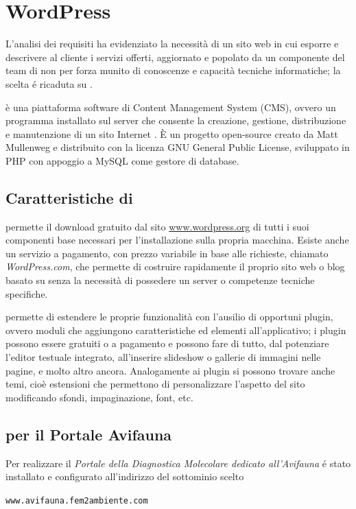 \chapter{WordPress}
\label{chp:wp}
L'analisi dei requisiti ha evidenziato la necessità di un sito web in cui esporre e descrivere al cliente i servizi offerti, aggiornato e popolato da un componente del team di {\fem} non per forza munito di conoscenze e capacità tecniche informatiche; la scelta é ricaduta su \emph{\wp}.

{\wp} è una piattaforma software di Content Management System (CMS), ovvero un programma installato sul server che consente la creazione, gestione, distribuzione e manutenzione di un sito Internet \cite{wordpress}. È un progetto open-source creato da Matt Mullenweg e distribuito con la licenza GNU General Public License, sviluppato in PHP con appoggio a MySQL come gestore di database.

\section{Caratteristiche di {\wp}}
{\wp} permette il download gratuito dal sito \url{www.wordpress.org} di tutti i suoi componenti base necessari per l'installazione sulla propria macchina. Esiste anche un servizio a pagamento, con prezzo variabile in base alle richieste, chiamato \emph{WordPress.com}, che permette di costruire rapidamente il proprio sito web o blog basato su {\wp} senza la necessità di possedere un server o competenze tecniche specifiche.

{\wp} permette di estendere le proprie funzionalità con l'ausilio di opportuni plugin, ovvero moduli che aggiungono caratteristiche ed elementi all'applicativo; i plugin possono essere gratuiti o a pagamento e possono fare di tutto, dal potenziare l'editor testuale integrato, all'inserire slideshow o gallerie di immagini nelle pagine, e molto altro ancora. Analogamente ai plugin si possono trovare anche temi, cioè estensioni che permettono di personalizzare l'aspetto del sito modificando sfondi, impaginazione, font, etc.

\section{{\wp} per il Portale Avifauna}
Per realizzare il \emph{Portale della Diagnostica Molecolare dedicato all'Avifauna} é stato installato e configurato {\wp} all'indirizzo del sottominio scelto 

\texttt{www.avifauna.fem2ambiente.com}

